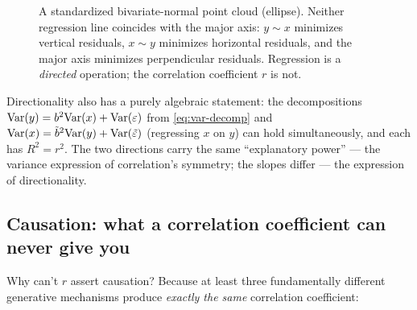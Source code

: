 \begin{figure}[htbp]
\centering
{}
\caption{A standardized bivariate-normal point cloud (ellipse). Neither regression line coincides with the major axis: $y \sim x$ minimizes vertical residuals, $x \sim y$ minimizes horizontal residuals, and the major axis minimizes perpendicular residuals. Regression is a \textit{directed} operation; the correlation coefficient $r$ is not.}
\label{fig:ellipse}
\end{figure}

Directionality also has a purely algebraic statement: the decompositions $\mathrm{Var}(y) = b^2\mathrm{Var}(x) + \mathrm{Var}(\varepsilon)$ from \eqref{eq:var-decomp} and $\mathrm{Var}(x) = \tilde{b}^2 \mathrm{Var}(y) + \mathrm{Var}(\tilde\varepsilon)$ (regressing $x$ on $y$) can hold simultaneously, and each has $R^2 = r^2$. The two directions carry the same ``explanatory power'' --- the variance expression of correlation's symmetry; the slopes differ --- the expression of directionality.

\subsection{Causation: what a correlation coefficient can never give you}\label{sec:1d-causality}

Why can't $r$ assert causation? Because at least three fundamentally different generative mechanisms produce \textit{exactly the same} correlation coefficient:


